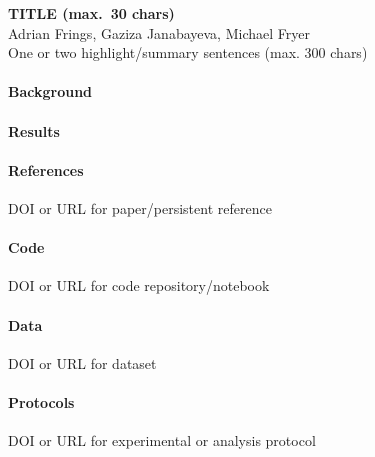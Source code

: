 \documentclass[10pt,a4paper]{article} %
\begin{document}
\begin{center}
    {\large\bfseries TITLE (max.\ 30 chars)}\\[0.5em]
    {\small Adrian Frings, Gaziza Janabayeva, Michael Fryer}\\[1em]
    {\small One or two highlight/summary sentences (max. 300 chars)}
\end{center}

\paragraph{Background}

\paragraph{Results}

\paragraph{References}
\begin{enumerate}[label={[\arabic*]}]
    \item DOI or URL for paper/persistent reference
\end{enumerate}

\paragraph{Code}
\begin{enumerate}[label={[\arabic*]}]
    \item DOI or URL for code repository/notebook
\end{enumerate}

\paragraph{Data}
\begin{enumerate}[label={[\arabic*]}]
    \item DOI or URL for dataset
\end{enumerate}

\paragraph{Protocols}
\begin{enumerate}[label={[\arabic*]}]
    \item DOI or URL for experimental or analysis protocol
\end{enumerate}
\end{document}
